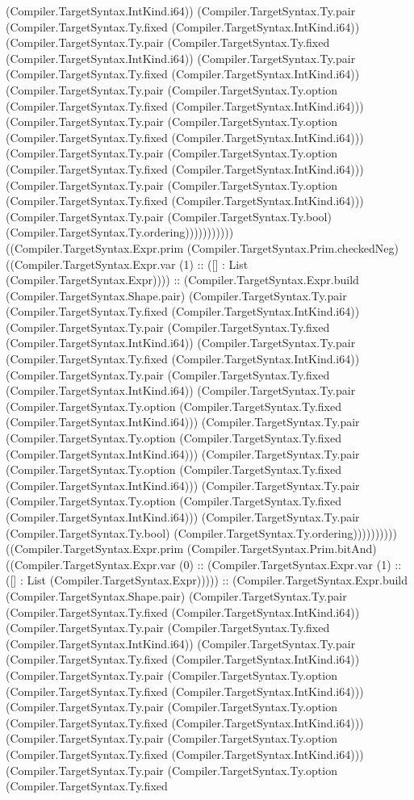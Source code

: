 \documentclass[11pt]{article}
\begin{document}
(Compiler.TargetSyntax.IntKind.i64)) (Compiler.TargetSyntax.Ty.pair (Compiler.TargetSyntax.Ty.fixed (Compiler.TargetSyntax.IntKind.i64)) (Compiler.TargetSyntax.Ty.pair (Compiler.TargetSyntax.Ty.fixed (Compiler.TargetSyntax.IntKind.i64)) (Compiler.TargetSyntax.Ty.pair (Compiler.TargetSyntax.Ty.fixed (Compiler.TargetSyntax.IntKind.i64)) (Compiler.TargetSyntax.Ty.pair (Compiler.TargetSyntax.Ty.option (Compiler.TargetSyntax.Ty.fixed (Compiler.TargetSyntax.IntKind.i64))) (Compiler.TargetSyntax.Ty.pair (Compiler.TargetSyntax.Ty.option (Compiler.TargetSyntax.Ty.fixed (Compiler.TargetSyntax.IntKind.i64))) (Compiler.TargetSyntax.Ty.pair (Compiler.TargetSyntax.Ty.option (Compiler.TargetSyntax.Ty.fixed (Compiler.TargetSyntax.IntKind.i64))) (Compiler.TargetSyntax.Ty.pair (Compiler.TargetSyntax.Ty.option (Compiler.TargetSyntax.Ty.fixed (Compiler.TargetSyntax.IntKind.i64))) (Compiler.TargetSyntax.Ty.pair (Compiler.TargetSyntax.Ty.bool) (Compiler.TargetSyntax.Ty.ordering))))))))))) ((Compiler.TargetSyntax.Expr.prim (Compiler.TargetSyntax.Prim.checkedNeg) ((Compiler.TargetSyntax.Expr.var (1) :: ([] : List (Compiler.TargetSyntax.Expr)))) :: (Compiler.TargetSyntax.Expr.build (Compiler.TargetSyntax.Shape.pair) (Compiler.TargetSyntax.Ty.pair (Compiler.TargetSyntax.Ty.fixed (Compiler.TargetSyntax.IntKind.i64)) (Compiler.TargetSyntax.Ty.pair (Compiler.TargetSyntax.Ty.fixed (Compiler.TargetSyntax.IntKind.i64)) (Compiler.TargetSyntax.Ty.pair (Compiler.TargetSyntax.Ty.fixed (Compiler.TargetSyntax.IntKind.i64)) (Compiler.TargetSyntax.Ty.pair (Compiler.TargetSyntax.Ty.fixed (Compiler.TargetSyntax.IntKind.i64)) (Compiler.TargetSyntax.Ty.pair (Compiler.TargetSyntax.Ty.option (Compiler.TargetSyntax.Ty.fixed (Compiler.TargetSyntax.IntKind.i64))) (Compiler.TargetSyntax.Ty.pair (Compiler.TargetSyntax.Ty.option (Compiler.TargetSyntax.Ty.fixed (Compiler.TargetSyntax.IntKind.i64))) (Compiler.TargetSyntax.Ty.pair (Compiler.TargetSyntax.Ty.option (Compiler.TargetSyntax.Ty.fixed (Compiler.TargetSyntax.IntKind.i64))) (Compiler.TargetSyntax.Ty.pair (Compiler.TargetSyntax.Ty.option (Compiler.TargetSyntax.Ty.fixed (Compiler.TargetSyntax.IntKind.i64))) (Compiler.TargetSyntax.Ty.pair (Compiler.TargetSyntax.Ty.bool) (Compiler.TargetSyntax.Ty.ordering)))))))))) ((Compiler.TargetSyntax.Expr.prim (Compiler.TargetSyntax.Prim.bitAnd) ((Compiler.TargetSyntax.Expr.var (0) :: (Compiler.TargetSyntax.Expr.var (1) :: ([] : List (Compiler.TargetSyntax.Expr))))) :: (Compiler.TargetSyntax.Expr.build (Compiler.TargetSyntax.Shape.pair) (Compiler.TargetSyntax.Ty.pair (Compiler.TargetSyntax.Ty.fixed (Compiler.TargetSyntax.IntKind.i64)) (Compiler.TargetSyntax.Ty.pair (Compiler.TargetSyntax.Ty.fixed (Compiler.TargetSyntax.IntKind.i64)) (Compiler.TargetSyntax.Ty.pair (Compiler.TargetSyntax.Ty.fixed (Compiler.TargetSyntax.IntKind.i64)) (Compiler.TargetSyntax.Ty.pair (Compiler.TargetSyntax.Ty.option (Compiler.TargetSyntax.Ty.fixed (Compiler.TargetSyntax.IntKind.i64))) (Compiler.TargetSyntax.Ty.pair (Compiler.TargetSyntax.Ty.option (Compiler.TargetSyntax.Ty.fixed (Compiler.TargetSyntax.IntKind.i64))) (Compiler.TargetSyntax.Ty.pair (Compiler.TargetSyntax.Ty.option (Compiler.TargetSyntax.Ty.fixed (Compiler.TargetSyntax.IntKind.i64))) (Compiler.TargetSyntax.Ty.pair (Compiler.TargetSyntax.Ty.option (Compiler.TargetSyntax.Ty.fixed 
\end{document}
